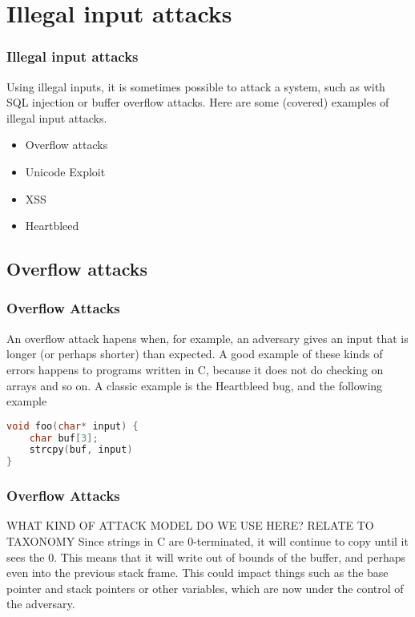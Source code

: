 \section{Illegal input attacks}
    \begin{frame}
        \frametitle{Illegal input attacks} 
            Using illegal inputs, it is sometimes possible to attack a system, such as with SQL injection or buffer overflow attacks. Here are some (covered) examples of illegal input attacks. 
            \begin{itemize}
                \item Overflow attacks
                \item Unicode Exploit
                \item XSS
                \item Heartbleed
            \end{itemize}
    \end{frame}

\subsection{Overflow attacks}
\begin{frame}[fragile]
    \frametitle{Overflow Attacks}
        An overflow attack hapens when, for example, an adversary gives an input that is longer (or perhaps shorter) than expected. A good example of these kinds of errors happens to programs written in C, because it does not do checking on arrays and so on. A classic example is the Heartbleed bug, and the following example
        \begin{lstlisting}[language=C, frame=single]
void foo(char* input) {
    char buf[3];
    strcpy(buf, input)
}
        \end{lstlisting}

\end{frame}
    \begin{frame}
        \frametitle{Overflow Attacks}
                WHAT KIND OF ATTACK MODEL DO WE USE HERE? RELATE TO TAXONOMY
            Since strings in C are 0-terminated, it will continue to copy until it sees the 0. This means that it will write out of bounds of the buffer, and perhaps even into the previous stack frame. This could impact things such as the base pointer and stack pointers or other variables, which are now under the control of the adversary.
    \end{frame}

